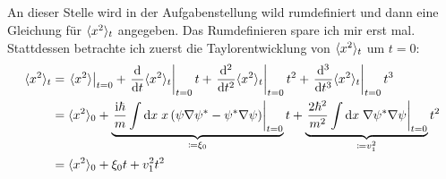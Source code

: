 \documentclass[11pt, ngerman, fleqn, DIV=15, headinclude]{scrartcl}
\newcommand\odx[3]{\frac{\dif^{#1} {#2}}{\dif {#3}^{#1}}}
\begin{document}
\subsection{}

An dieser Stelle wird in der Aufgabenstellung wild rumdefiniert und dann eine Gleichung für $\langle x^2 \rangle_t$ angegeben. Das Rumdefinieren spare ich mir erst mal. Stattdessen betrachte ich zuerst die Taylorentwicklung von $\langle x^2 \rangle_t$ um $t=0$:
\begin{align*}
	\bracket{x^2}_t	&= \left.\bracket{x^2}\right|_{t=0}+\left.\od{}{t}\bracket{x^2}_t\right|_{t=0}t+\left.\odx{2}{}{t}\bracket{x^2}_t\right|_{t=0}t^2+\left.\odx{3}{}{t}\bracket{x^2}_t\right|_{t=0}t^3\\
					&= \bracket{x^2}_0+\underbrace{\left.\frac{\iup\hbar}{m}\int\dif x\; x\del{\psi\nabla\psi^*-\psi^*\nabla\psi}\right|_{t=0}}_{\coloneqq \xi_0}t+\underbrace{\left.\frac{2\hbar^2}{m^2}\int\dif x\; \nabla\psi^*\nabla\psi\right|_{t=0}}_{\coloneqq v_1^2}t^2\\
					&= \bracket{x^2}_0+\xi_0t+v_1^2t^2
\end{align*}

\subsection{}
\end{document}
